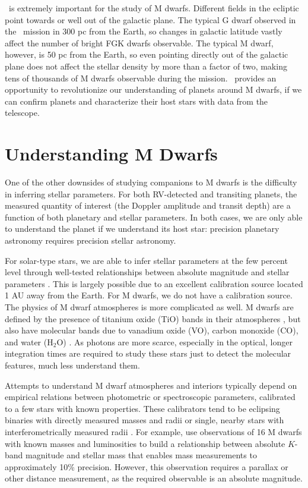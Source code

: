 \KT\ is extremely important for the study of M dwarfs.
Different fields in the ecliptic point towards or well out of the galactic plane.
The typical G dwarf observed in the \kep\ mission in 300 pc from the Earth, so changes
in galactic latitude vastly affect the number of bright FGK dwarfs observable.
The typical M dwarf, however, is 50 pc from the Earth, so even pointing directly out of the
galactic plane does not affect the stellar density by more than a factor of two, making 
tens of thousands of M dwarfs observable during the mission. 
\KT\ provides an opportunity to revolutionize our understanding of planets around M dwarfs,
if we can confirm planets and characterize their host stars with data from the telescope.

\section{Understanding M Dwarfs}
One of the other downsides of studying companions to M dwarfs is the difficulty 
in inferring stellar parameters.
For both RV-detected and transiting planets, the measured quantity of interest 
(the Doppler amplitude and transit depth) are a function of both planetary and stellar
parameters. 
In both cases, we are only able to understand the planet if we understand its host star:
precision planetary astronomy requires precision stellar astronomy.

For solar-type stars, we are able to infer stellar parameters at the few percent level
through well-tested relationships between absolute magnitude and stellar parameters
\citep{Andersen91, Casagrande10}.
This is largely possible due to an excellent calibration source located 1 AU away from the 
Earth.
For M dwarfs, we do not have a calibration source.
The physics of M dwarf atmospheres is more complicated as well.
M dwarfs are defined by the presence of titanium oxide (TiO) bands in their
atmospheres \citep{Kuiper38, Morgan38}, but also have molecular bands due to
vanadium oxide (VO), carbon monoxide (CO), and water (H$_2$O) \citep[e.g.][]{Mould75, Muirhead12b}.
As photons are more scarce, especially in the optical, longer integration times are 
required to study these stars just to detect the molecular features, much less
understand them.


Attempts to understand M dwarf atmospheres and interiors typically depend on empirical 
relations between photometric or spectroscopic parameters, calibrated to a few stars
with known properties.
These calibrators tend to be eclipsing binaries with directly measured masses and radii 
\citep{Birkby12} or single, nearby stars with interferometrically measured radii \citep{Boyajian12}.
For example, \citet{Delfosse00} use observations of 16 M dwarfs with known masses and
luminosities to build a relationship between absolute $K$-band magnitude and stellar mass
that enables mass measurements to approximately 10\% precision.
However, this observation requires a parallax or other distance measurement, as the
required observable is an absolute magnitude.

